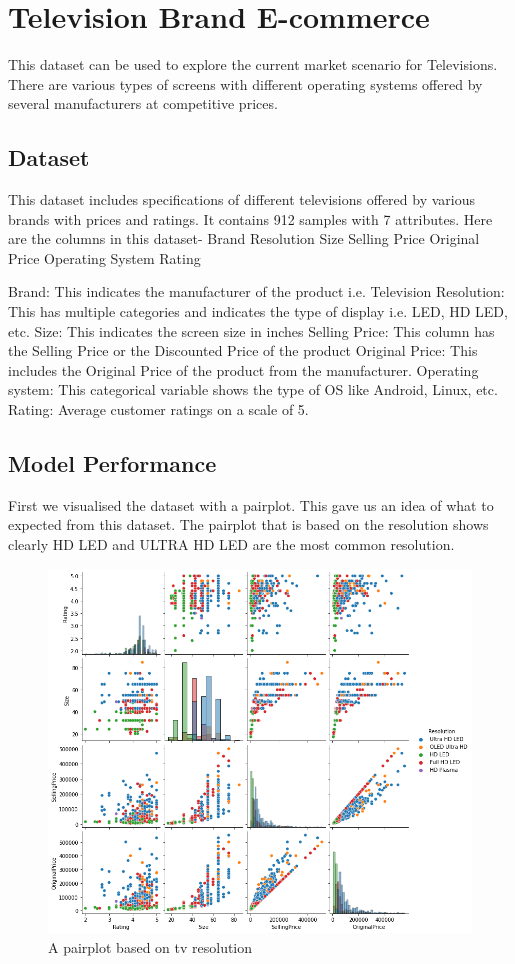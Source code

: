 \section{Television Brand E-commerce}
This dataset can be used to explore the current market scenario for Televisions. There are various types of screens with different operating systems offered by several manufacturers at competitive prices.

\subsection{Dataset}
This dataset includes specifications of different televisions offered by various brands with prices and ratings.
It contains 912 samples with 7 attributes. Here are the columns in this dataset-
Brand Resolution Size Selling Price Original Price Operating System Rating

Brand: This indicates the manufacturer of the product i.e. Television
Resolution: This has multiple categories and indicates the type of display i.e. LED, HD LED, etc.
Size: This indicates the screen size in inches
Selling Price: This column has the Selling Price or the Discounted Price of the product
Original Price: This includes the Original Price of the product from the manufacturer.
Operating system: This categorical variable shows the type of OS like Android, Linux, etc.
Rating: Average customer ratings on a scale of 5.

\subsection{Model Performance}
First we visualised the dataset with a pairplot.
This gave us an idea of what to expected from this dataset.
The pairplot that is based on the resolution shows clearly HD LED and ULTRA HD LED are the most common resolution.
\begin{figure}
    \includegraphics[width=\linewidth]{images/pairplot_resolution.png}
    \caption{A pairplot based on tv resolution}
    \label{fig:pairplot resolution}
\end{figure}

